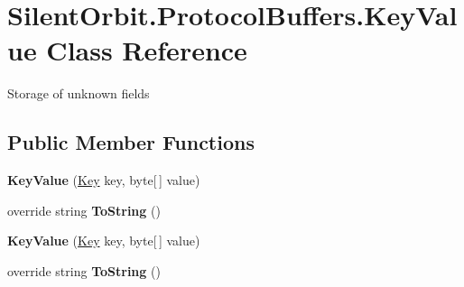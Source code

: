 \hypertarget{class_silent_orbit_1_1_protocol_buffers_1_1_key_value}{}\section{Silent\+Orbit.\+Protocol\+Buffers.\+Key\+Value Class Reference}
\label{class_silent_orbit_1_1_protocol_buffers_1_1_key_value}


Storage of unknown fields  


\subsection*{Public Member Functions}
\begin{DoxyCompactItemize}
\item 
\hypertarget{class_silent_orbit_1_1_protocol_buffers_1_1_key_value_a0c2f85ee43da09988ea6ce9f265ad471}{}{\bfseries Key\+Value} (\hyperlink{class_silent_orbit_1_1_protocol_buffers_1_1_key}{Key} key, byte\mbox{[}$\,$\mbox{]} value)\label{class_silent_orbit_1_1_protocol_buffers_1_1_key_value_a0c2f85ee43da09988ea6ce9f265ad471}

\item 
\hypertarget{class_silent_orbit_1_1_protocol_buffers_1_1_key_value_a659b764ee7159314181fc2f57547b59c}{}override string {\bfseries To\+String} ()\label{class_silent_orbit_1_1_protocol_buffers_1_1_key_value_a659b764ee7159314181fc2f57547b59c}

\item 
\hypertarget{class_silent_orbit_1_1_protocol_buffers_1_1_key_value_a0c2f85ee43da09988ea6ce9f265ad471}{}{\bfseries Key\+Value} (\hyperlink{class_silent_orbit_1_1_protocol_buffers_1_1_key}{Key} key, byte\mbox{[}$\,$\mbox{]} value)\label{class_silent_orbit_1_1_protocol_buffers_1_1_key_value_a0c2f85ee43da09988ea6ce9f265ad471}

\item 
\hypertarget{class_silent_orbit_1_1_protocol_buffers_1_1_key_value_a659b764ee7159314181fc2f57547b59c}{}override string {\bfseries To\+String} ()\label{class_silent_orbit_1_1_protocol_buffers_1_1_key_value_a659b764ee7159314181fc2f57547b59c}

\end{DoxyCompactItemize}
